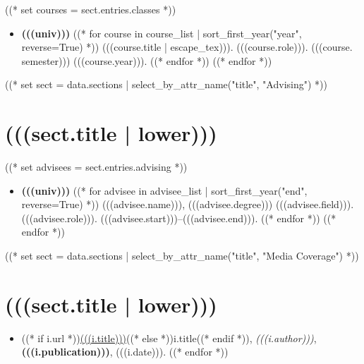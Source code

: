 \documentclass[10pt,oneside]{article}
\begin{document}
\mbox{}\vspace{-\dimexpr\baselineskip\relax}

((* set courses = sect.entries.classes *))
\begin{itemize}[label={}]
  ((* for univ, course_list in courses | groupby("university")  *))
  \item \textbf{(((univ)))}
        ((* for course in course_list | sort_first_year("year", reverse=True) *))
        (((course.title | escape_tex))). (((course.role))). (((course. semester))) (((course.year))).
        ((* endfor *))
        ((* endfor *))
\end{itemize}

((* set sect = data.sections | select_by_attr_name("title", "Advising") *))
\section{(((sect.title | lower)))}

\mbox{}\vspace{-\dimexpr\baselineskip\relax}

((* set advisees = sect.entries.advising *))
\begin{itemize}[label={}]
  ((* for univ, advisee_list in advisees | groupby("university")  *))
  \item \textbf{(((univ)))}
        ((* for advisee in advisee_list | sort_first_year("end", reverse=True) *))
        (((advisee.name))), (((advisee.degree))) (((advisee.field))). (((advisee.role))). (((advisee.start)))--(((advisee.end))).
        ((* endfor *))
        ((* endfor *))
\end{itemize}

((* set sect = data.sections | select_by_attr_name("title", "Media Coverage") *))
\section{(((sect.title | lower)))}

\mbox{}\vspace{-\dimexpr\baselineskip\relax}

\begin{itemize}[label={}]
  ((* for i in sect.entries.media | sort(attribute="date", reverse=True) *))
  \item ((* if i.url *))\href{(((i.url)))}{(((i.title)))}((* else *))i.title((* endif *)), \textit{(((i.author)))}, \textbf{(((i.publication)))}, (((i.date))).
        ((* endfor *))
\end{itemize}
\end{document}
